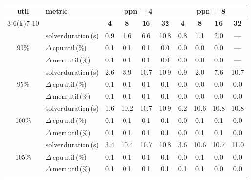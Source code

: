 \begin{tabular}{@{}c l *{8}{c}@{}}
\toprule
\multirow{2}{*}{\textbf{util}} & \multirow{2}{*}{\textbf{metric}} &\multicolumn{4}{c}{\textbf{ppn = 4}} & \multicolumn{4}{c}{\textbf{ppn = 8}}\\
\cmidrule(lr){3-6}\cmidrule(lr){7-10}
 &  & \textbf{4} & \textbf{8} & \textbf{16} & \textbf{32} & \textbf{4} & \textbf{8} & \textbf{16} & \textbf{32}\\
\midrule
\multirow{3}{*}{90\%}
& solver\,duration\,(s) & 0.9 & 1.6 & 6.6 & 10.8 & 0.8 & 1.1 & 2.0 & \multicolumn{1}{c}{—} \\
& $\Delta$\,cpu\,util\,(\%) & 0.1 & 0.1 & 0.1 & 0.0 & 0.0 & 0.0 & 0.0 & \multicolumn{1}{c}{—} \\
& $\Delta$\,mem\,util\,(\%) & 0.1 & 0.1 & 0.1 & 0.0 & 0.0 & 0.0 & 0.0 & \multicolumn{1}{c}{—} \\
\midrule
\multirow{3}{*}{95\%}
& solver\,duration\,(s) & 2.6 & 8.9 & 10.7 & 10.9 & 0.9 & 2.0 & 7.6 & 10.7 \\
& $\Delta$\,cpu\,util\,(\%) & 0.1 & 0.1 & 0.1 & 0.1 & 0.0 & 0.0 & 0.0 & 0.0 \\
& $\Delta$\,mem\,util\,(\%) & 0.1 & 0.1 & 0.1 & 0.1 & 0.0 & 0.0 & 0.0 & 0.0 \\
\midrule
\multirow{3}{*}{100\%}
& solver\,duration\,(s) & 1.6 & 10.2 & 10.7 & 10.9 & 6.2 & 10.6 & 10.8 & 10.8 \\
& $\Delta$\,cpu\,util\,(\%) & 0.1 & 0.1 & 0.1 & 0.1 & 0.0 & 0.1 & 0.1 & 0.0 \\
& $\Delta$\,mem\,util\,(\%) & 0.1 & 0.1 & 0.1 & 0.1 & 0.0 & 0.1 & 0.1 & 0.0 \\
\midrule
\multirow{3}{*}{105\%}
& solver\,duration\,(s) & 3.4 & 10.4 & 10.7 & 10.8 & 3.6 & 10.6 & 10.7 & 11.0 \\
& $\Delta$\,cpu\,util\,(\%) & 0.1 & 0.1 & 0.1 & 0.1 & 0.0 & 0.1 & 0.0 & 0.0 \\
& $\Delta$\,mem\,util\,(\%) & 0.1 & 0.1 & 0.1 & 0.1 & 0.1 & 0.1 & 0.0 & 0.0 \\
\bottomrule
\end{tabular}

